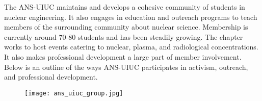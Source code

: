 The ANS-UIUC maintains and develops a cohesive community of students in nuclear engineering. It also engages in education and outreach programs to teach members of the surrounding community about nuclear science. Membership is currently around 70-80 students and has been steadily growing. The chapter works to host events catering to nuclear, plasma, and radiological concentrations. It also makes professional development a large part of member involvement. Below is an outline of the ways ANS-UIUC participates in activism, outreach, and professional development. 

\begin{figure}
	\centering
	\texttt{[image: ans\_uiuc\_group.jpg]}
\end{figure}